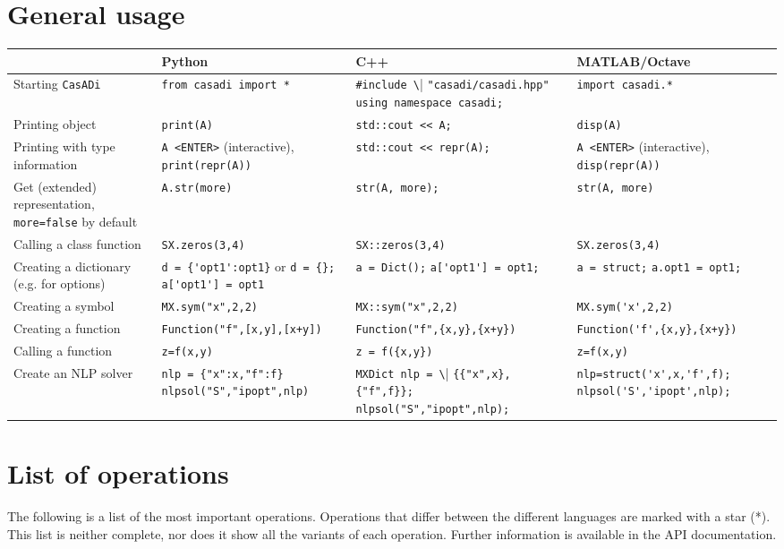 \documentclass[a4paper,12pt]{book}
\newcommand{\CasADi}{\texttt{CasADi}\xspace}
\begin{document}
\section{General usage}
\begin{center}
  \scriptsize
  \begin{tabular}{| p{3.5cm} | p{3.5cm} | p{3.5cm} | p{3.5cm} | }
    \hline
      & Python & C++ & MATLAB/Octave \\ \hline
    Starting \CasADi & \verb|from casadi import *| & \verb|#include \| \verb|"casadi/casadi.hpp"| \verb|using namespace casadi;| & \verb|import casadi.*| \\ \hline
    Printing object & \verb|print(A)| & \verb|std::cout << A;|& \verb|disp(A)| \\ \hline
    Printing with type information & \verb|A <ENTER>| (interactive), \verb|print(repr(A))| & \verb|std::cout << repr(A);|& \verb|A <ENTER>| (interactive), \verb|disp(repr(A))|\\ \hline
    Get (extended) representation, \verb|more=false| by default& \verb|A.str(more)| & \verb|str(A, more);|& \verb|str(A, more)| \\ \hline
    Calling a class function & \verb|SX.zeros(3,4)| & \verb|SX::zeros(3,4)| & \verb|SX.zeros(3,4)|\\ \hline
    Creating a dictionary (e.g. for options) & \verb|d = {'opt1':opt1}| or \verb|d = {}; a['opt1'] = opt1| & \verb|a = Dict();| \verb|a['opt1'] = opt1;| & \verb|a = struct;| \verb|a.opt1 = opt1;| \\ \hline
    Creating a symbol & \verb|MX.sym("x",2,2)| & \verb|MX::sym("x",2,2)| & \verb|MX.sym('x',2,2)|\\ \hline
    Creating a function & \verb|Function("f",[x,y],[x+y])| & \verb|Function("f",{x,y},{x+y})| & \verb|Function('f',{x,y},{x+y})| \\ \hline
    Calling a function & \verb|z=f(x,y)| & \verb|z = f({x,y})| & \verb|z=f(x,y)| \\ \hline
    Create an NLP solver & \verb|nlp = {"x":x,"f":f}| \verb|nlpsol("S","ipopt",nlp)| & \verb|MXDict nlp = \|    \verb|{{"x",x},{"f",f}};|  \verb|nlpsol("S","ipopt",nlp);| & \verb|nlp=struct('x',x,'f',f);| \verb|nlpsol('S','ipopt',nlp);| \\ \hline
  \end{tabular}
\end{center}

\section{List of operations}
The following is a list of the most important operations. Operations that differ between the different
languages are marked with a star (*). This list is neither complete, nor does it show all the variants of
each operation. Further information is available in the API documentation.
\end{document}

